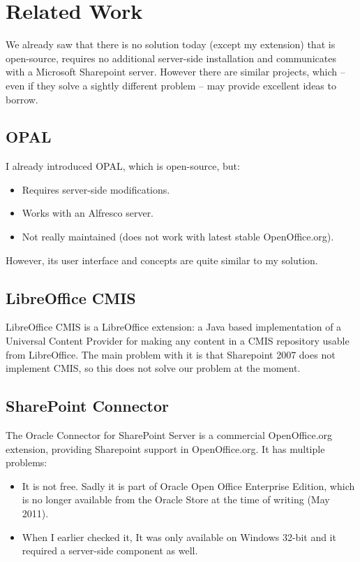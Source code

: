 \section{Related Work}

We already saw that there is no solution today (except my extension) that is
open-source, requires no additional server-side installation and communicates
with a Microsoft Sharepoint server. However there are similar projects, which
-- even if they solve a sightly different problem -- may provide excellent
ideas to borrow.

\subsection*{OPAL}
I already introduced OPAL, which is open-source, but:

\begin{itemize}
\item Requires server-side modifications.
\item Works with an Alfresco server.
\item Not really maintained (does not work with latest stable OpenOffice.org).
\end{itemize}

However, its user interface and concepts are quite similar to my solution.

\subsection*{LibreOffice CMIS}
LibreOffice CMIS\cite{locmis} is a LibreOffice extension: a Java based
implementation of a Universal Content Provider for making any content in a CMIS
repository usable from LibreOffice. The main problem with it is that Sharepoint
2007 does not implement CMIS, so this does not solve our problem at the moment.

\subsection*{SharePoint Connector}
The Oracle Connector for SharePoint Server\cite{oracle-sp-connector} is a
commercial OpenOffice.org extension, providing Sharepoint support in
OpenOffice.org. It has multiple problems:

\begin{itemize}
\item It is not free. Sadly it is part of Oracle Open Office Enterprise
Edition, which is no longer available from the Oracle Store at the time of
writing (May 2011).
\item When I earlier checked it, It was only available on Windows 32-bit and it
required a server-side component as well.
\end{itemize}

